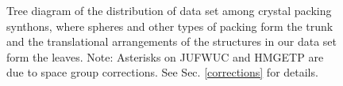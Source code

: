 \documentclass[preprint]{iucr}              %
\begin{document}
\begin{figure}
\caption{Tree diagram of the distribution of data set among crystal packing synthons, where spheres and other types of packing form the trunk and the translational arrangements of the structures in our data set form the leaves. \scriptsize{Note: Asterisks on JUFWUC and HMGETP are due to space group corrections.  See Sec. \ref{corrections} for details.}}
\label{fig_provenance}
\end{figure}
\end{document}
